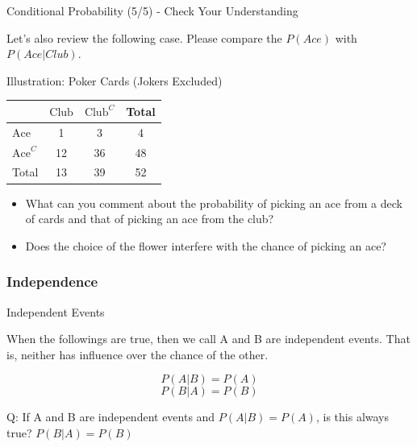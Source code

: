 \documentclass{beamer}
\begin{document}
\begin{frame}{Conditional Probability (5/5) - Check Your Understanding}

Let's also review the following case. Please compare the $P(Ace)$ with $P(Ace | Club).$

\begin{center}
Illustration: Poker Cards (Jokers Excluded)
\end{center}

\begin{center}
\begin{tabular}{l|c|c|c}
\hline 
& $ \text{Club} $ & $\text{Club}^C$ & Total \\ 
\hline 
$\text{Ace} $ & 1 & 3 & 4 \\ 
\hline 
$\text{Ace}^C $ & 12 & 36 & 48 \\ 
\hline 
Total & 13 & 39 & 52 \\ 
\hline 
\end{tabular}
\end{center}

\begin{itemize}
\item What can you comment about the probability of picking an ace from a deck of cards and that of picking an ace from the club? 

\item Does the choice of the flower interfere with the chance of picking an ace? 
\end{itemize}

\end{frame}


\subsubsection{Independence}
\begin{frame}{Independent Events}

When the followings are true, then we call A and B are independent events. That is, neither has influence over the chance of the other.

$$P(A|B) = P(A)$$
$$P(B|A) = P(B)$$

Q: If A and B are independent events and $P(A|B) = P(A)$, is this always true? $P(B|A) = P(B)$

\end{frame}
\end{document}
